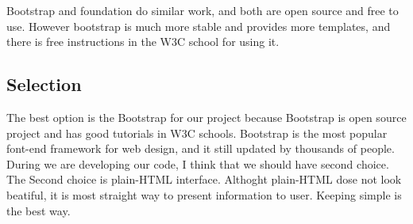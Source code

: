 Bootstrap and foundation do similar work, and both are open source and free to use.
However bootstrap is much more stable and provides more templates, and there is free instructions in the W3C school for using it.

\subsection{Selection}

The best option is the Bootstrap for our project because Bootstrap is open source project and has good tutorials in W3C schools.
Bootstrap is the most popular font-end framework for web design, and it still updated by thousands of people.
During we are developing our code, I think that we should have second choice.
The Second choice is plain-HTML interface.
Althoght plain-HTML dose not look beatiful, it is most straight way to present information to user.
Keeping simple is the best way.